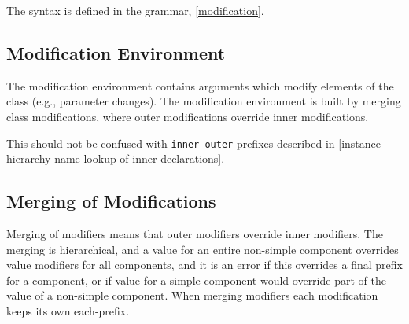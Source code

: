 The syntax is defined in the grammar, \autoref{modification}.

\subsection{Modification Environment}

The modification environment contains arguments which modify elements of
the class (e.g., parameter changes). The modification environment is
built by merging class modifications, where outer modifications override
inner modifications.

\begin{nonnormative}
This should not be confused with \lstinline!inner outer! prefixes described in \autoref{instance-hierarchy-name-lookup-of-inner-declarations}.
\end{nonnormative}

\subsection{Merging of Modifications}

Merging of modifiers means that outer modifiers override inner
modifiers. The merging is hierarchical, and a value for an entire
non-simple component overrides value modifiers for all components, and
it is an error if this overrides a final prefix for a component, or if
value for a simple component would override part of the value of a
non-simple component. When merging modifiers each modification keeps its
own each-prefix.

